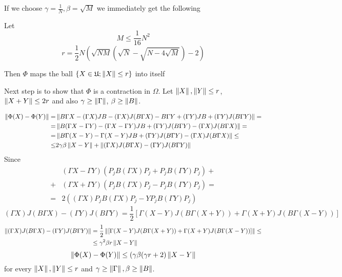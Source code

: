 \documentclass{article}
\begin{document}
If we choose \( \gamma=\frac{1}{N}, \beta=\sqrt{M} \) we immediately get the following
\begin{corollary}\label{thm:endo_nm}
    Let
    \begin{equation}\label{eq:phi_endo_nm_condition}
        M \leq \frac{1}{16} N^2
    \end{equation}
    \begin{equation}\label{eq:phi_endo_nm_radia}
        r = \frac12 N
        \left(
        \sqrt{NM}(\sqrt{N} - \sqrt{N-4\sqrt{M}}) - 2
        \right)
    \end{equation}

    Then
    \( \Phi \) maps the ball \( \{ X\in\mathfrak U; \left\|{X}\right\| \leq r \} \) into itself
\end{corollary}

Next step is to show that \( \Phi \) is a contraction in \( \Omega \).
Let \( \left\|{X}\right\|, \left\|{Y}\right\| \leq r \), \( \left\|{X+Y}\right\| \leq 2r \) and also \( \gamma\geq\left\|{\Gamma}\right\| \), \( \beta\geq\left\|{B}\right\| \).

\begin{align*}
    \left\|{\Phi(X) - \Phi(Y)}\right\|
    =& \left\|{B\Gamma X - (\Gamma X)JB - (\Gamma X)J(B\Gamma X) - B\Gamma Y + (\Gamma Y)JB + (\Gamma Y)J(B\Gamma Y)}\right\| = \\
    =& \left\|{B(\Gamma X - \Gamma Y) - (\Gamma X - \Gamma Y) JB + (\Gamma Y) J(B\Gamma Y) - (\Gamma X)J(B\Gamma X)}\right\| = \\
    =& \left\|{B\Gamma(X-Y) - \Gamma(X-Y)JB + (\Gamma Y) J(B\Gamma Y) - (\Gamma X)J(B\Gamma X)}\right\| \leq \\
    \leq& 2\gamma\beta\left\|{X-Y}\right\| + \left\|{(\Gamma X)J(B\Gamma X) - (\Gamma Y) J(B\Gamma Y)}\right\|
\end{align*}
Since 
\begin{align*}
    &(\Gamma X - \Gamma Y)(P_jB(\Gamma X)P_j + P_jB(\Gamma Y)P_j) + \\
    + &(\Gamma X + \Gamma Y)(P_jB(\Gamma X)P_j - P_jB(\Gamma Y)P_j) = \\
= &2((\Gamma X)P_jB(\Gamma X)P_j- YP_jB(\Gamma Y)P_j)\end{align*}
\[(\Gamma X)J(B\Gamma X) - (\Gamma Y) J(B\Gamma Y)
= \frac12\left[\Gamma(X-Y)J(B\Gamma(X+Y)) + \Gamma(X+Y)J(B\Gamma(X-Y))\right]\]
\begin{align*}
    \left\|{(\Gamma X)J(B\Gamma X) - (\Gamma Y) J(B\Gamma Y)}\right\|
    &= \frac12\left\|{\left[\Gamma(X-Y)J(B\Gamma(X+Y)) + \Gamma(X+Y)J(B\Gamma(X-Y))\right]}\right\|\leq \\
    &\leq \gamma^2\beta r \left\|{X-Y}\right\|
\end{align*}
\[\left\|{\Phi(X) - \Phi(Y)}\right\| \leq (\gamma\beta(\gamma r + 2)\left\|{X-Y}\right\|\]
for every \( \left\|{X}\right\|, \left\|{Y}\right\| \leq r \) and \( \gamma\geq\left\|{\Gamma}\right\|, \beta\geq\left\|{B}\right\| \).
\end{document}

